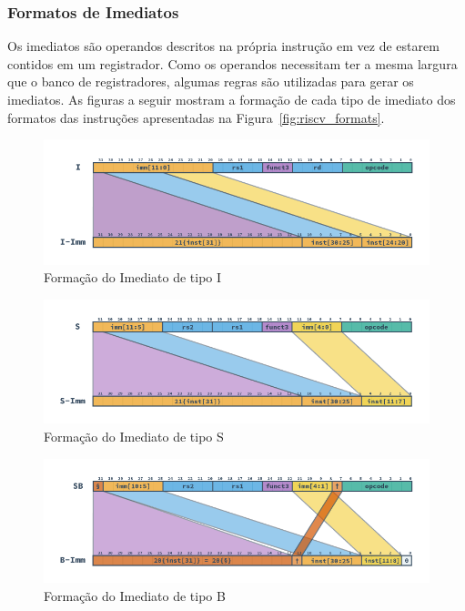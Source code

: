         \subsubsection{Formatos de Imediatos}
        { Os imediatos são operandos descritos na própria instrução em vez de
            estarem contidos em um registrador. Como os operandos necessitam ter
            a mesma largura que o banco de registradores, algumas regras são
            utilizadas para gerar os imediatos. As figuras a seguir mostram a
            formação de cada tipo de imediato dos formatos das instruções
            apresentadas na Figura~\ref{fig:riscv_formats}.
        }

        \begin{figure}[H]
        \centering
            \includegraphics[width=.9\linewidth]{../images/RV_I_Imm.png}
            \caption{Formação do Imediato de tipo I
                }\label{fig:riscv_i_imm}
        \end{figure}

        \begin{figure}[H]
        \centering
            \includegraphics[width=.9\linewidth]{../images/RV_S_Imm.png}
            \caption{Formação do Imediato de tipo S
                }\label{fig:riscv_s_imm}
        \end{figure}

        \begin{figure}[H]
        \centering
            \includegraphics[width=.9\linewidth]{../images/RV_B_Imm.png}
            \caption{Formação do Imediato de tipo B
                }\label{fig:riscv_b_imm}
        \end{figure}

